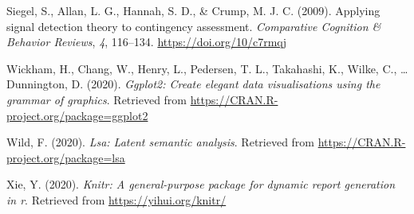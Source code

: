 \documentclass[
  english,
  man,floatsintext]{apa6}
\begin{document}
\leavevmode\hypertarget{ref-siegelApplyingSignalDetection2009}{}%
Siegel, S., Allan, L. G., Hannah, S. D., \& Crump, M. J. C. (2009). Applying signal detection theory to contingency assessment. \emph{Comparative Cognition \& Behavior Reviews}, \emph{4}, 116--134. \url{https://doi.org/10/c7rmqj}

\leavevmode\hypertarget{ref-R-ggplot2}{}%
Wickham, H., Chang, W., Henry, L., Pedersen, T. L., Takahashi, K., Wilke, C., \ldots{} Dunnington, D. (2020). \emph{Ggplot2: Create elegant data visualisations using the grammar of graphics}. Retrieved from \url{https://CRAN.R-project.org/package=ggplot2}

\leavevmode\hypertarget{ref-R-lsa}{}%
Wild, F. (2020). \emph{Lsa: Latent semantic analysis}. Retrieved from \url{https://CRAN.R-project.org/package=lsa}

\leavevmode\hypertarget{ref-R-knitr}{}%
Xie, Y. (2020). \emph{Knitr: A general-purpose package for dynamic report generation in r}. Retrieved from \url{https://yihui.org/knitr/}

\endgroup


\clearpage
\makeatletter
\efloat@restorefloats
\makeatother
\end{document}
